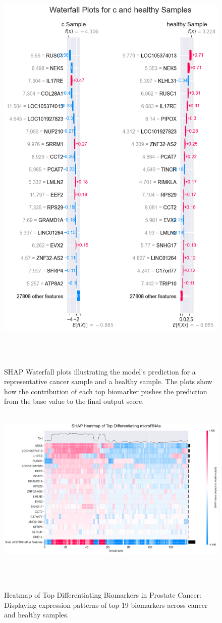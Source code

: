 \documentclass[journal]{IEEEtran}
\begin{document}
\begin{figure}[htbp]
 \centering
 \includegraphics[width=0.8\linewidth]{prostate_cancer_figures/differential/shap_waterfall_subplots_c_and_healthy.png}
 \caption{SHAP Waterfall plots illustrating the model's prediction for a representative cancer sample and a healthy sample. The plots show how the contribution of each top biomarker pushes the prediction from the base value to the final output score.}
 \label{fig:prostate_shap_waterfall_new}
\end{figure}

\begin{figure}[htbp]
 \centering
 \includegraphics[width=1\linewidth]{prostate_cancer_figures/differential/shap_heatmap_plot_c_and_healthy.png}
 \caption{Heatmap of Top Differentiating Biomarkers in Prostate Cancer: Displaying expression patterns of top 19 biomarkers across cancer and healthy samples.}
 \label{fig:prostate_heatmap}
\end{figure}
\end{document}
